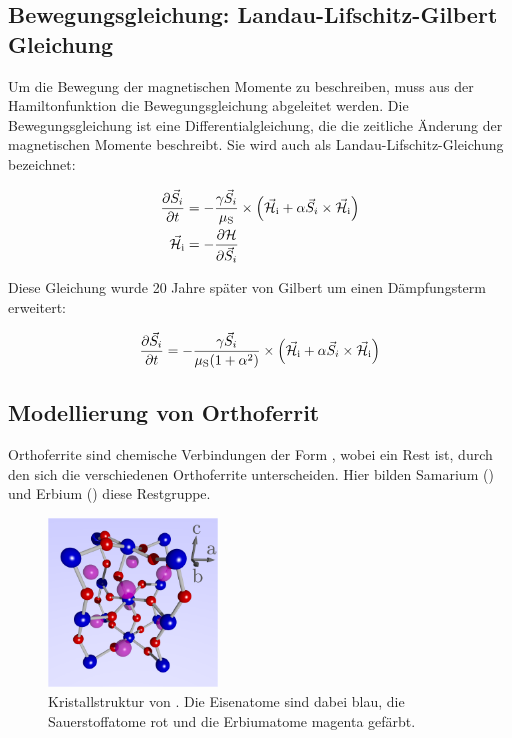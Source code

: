 \documentclass[main.tex]{subfiles}
\begin{document}
\subsection{Bewegungsgleichung: Landau-Lifschitz-Gilbert Gleichung}
Um die Bewegung der magnetischen Momente zu beschreiben, muss aus der
Hamiltonfunktion die Bewegungsgleichung abgeleitet werden. Die
Bewegungsgleichung ist eine Differentialgleichung, die die zeitliche Änderung
der magnetischen Momente beschreibt. Sie wird auch als
Landau-Lifschitz-Gleichung bezeichnet:

\begin{align}
	\pdv{\vec{S}_i}{t}     & = -\frac{\gamma \vec{S}_i}{\mu_{\text{S}}}
	\times
	\qty(\vec{\mathcal{H}}_{\text{i}} + \alpha \vec{S}_i \times
	\vec{\mathcal{H}}_{\text{i}})
	\\
	\vec{\mathcal{H}}_{\text{i}} & = - \pdv{\mathcal{H}}{\vec{S}_i}
\end{align}\cite{landau-lifshitz}

Diese Gleichung wurde 20 Jahre später von Gilbert um einen Dämpfungsterm
erweitert:

\begin{align}
	\pdv{\vec{S}_i}{t} = -\frac{\gamma
		\vec{S}_i}{\mu_{\text{S}}(1+\alpha^2)}
	\times
	\qty(\vec{\mathcal{H}}_{\text{i}} + \alpha \vec{S}_i \times
	\vec{\mathcal{H}}_{\text{i}})
\end{align}\cite{Gilbert-damping}


\subsection{Modellierung von Orthoferrit}

Orthoferrite sind chemische Verbindungen der Form , wobei  ein
Rest ist, durch den sich die verschiedenen Orthoferrite unterscheiden. Hier
bilden Samarium () und Erbium () diese Restgruppe.

\begin{figure}[H]
	\centering

	\includegraphics[width=0.4\textwidth]{bilder/jschlege/UnitCell_labeled.png}
	\caption{Kristallstruktur von
		. Die Eisenatome sind dabei blau, die
		Sauerstoffatome rot und die Erbiumatome magenta gefärbt.
		\cite{schlegel-master}}
	\label{fig:orthoferrit}
\end{figure}
\end{document}
